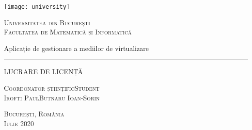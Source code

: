 \begin{titlepage}
	\begin{center}

		\texttt{[image: university]}

		\vspace{0.5cm}
		\LARGE \textsc{Universitatea din București}
		\\
		\vspace{0.5cm}
		\Large \textsc{Facultatea de Matematică și Informatică}

		\vfill

		\Huge Aplicație de gestionare a mediilor de virtualizare
		\rule{\textwidth}{1pt}
		\Large LUCRARE DE LICENȚĂ

		\vfill

		\Large
		\textsc{Coordonator științific}\hfill \textsc{Student}
		\\
		\large
		\textsc{Irofti Paul}\hfill \textsc{Butnaru Ioan-Sorin}

		\vspace{1.5cm}
		\textsc{București, România}\\
		\textsc{Iulie 2020}

	\end{center}
\end{titlepage}

